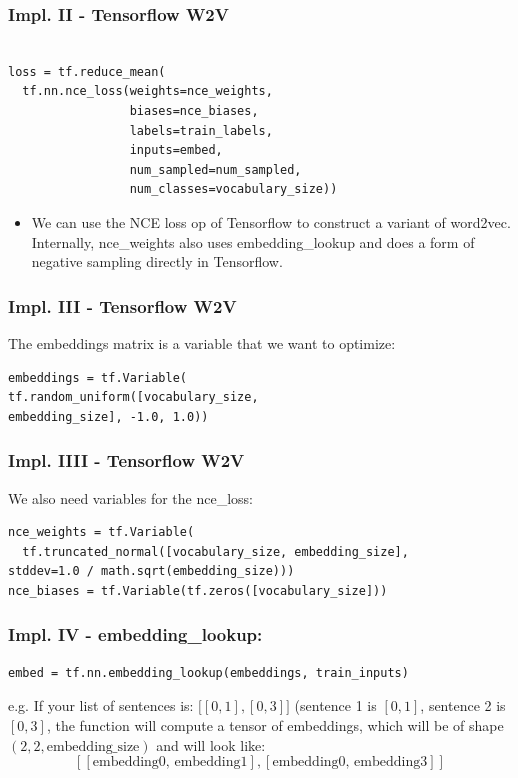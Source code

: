 \documentclass{beamer}
\begin{document}
 
   






\begin{frame}[fragile]
  \frametitle{Impl. II - Tensorflow W2V}
  \begin{lstlisting}

loss = tf.reduce_mean(
  tf.nn.nce_loss(weights=nce_weights,
                 biases=nce_biases,
                 labels=train_labels,
                 inputs=embed,
                 num_sampled=num_sampled,
                 num_classes=vocabulary_size))
    \end{lstlisting}
    
  \begin{itemize}
  	\item We can use the NCE loss op of Tensorflow to construct a variant of word2vec. Internally, nce\_weights also uses embedding\_lookup and does a form of negative sampling  directly in Tensorflow.
  \end{itemize}
\end{frame}
    
 \begin{frame}[fragile]
  \frametitle{Impl. III - Tensorflow W2V}
  The embeddings matrix is a variable that we want to optimize:
  \begin{lstlisting}
embeddings = tf.Variable(
tf.random_uniform([vocabulary_size,
embedding_size], -1.0, 1.0))
\end{lstlisting}    
\end{frame}

 \begin{frame}[fragile]
 \frametitle{Impl. IIII - Tensorflow W2V}
We also need variables for the nce\_loss:

\begin{footnotesize}
\begin{lstlisting}
nce_weights = tf.Variable(
  tf.truncated_normal([vocabulary_size, embedding_size],
stddev=1.0 / math.sqrt(embedding_size)))
nce_biases = tf.Variable(tf.zeros([vocabulary_size]))
\end{lstlisting}   
\end{footnotesize}    
\end{frame}

 \begin{frame}[fragile]
  \frametitle{Impl. IV - embedding\_lookup:}
  
  \begin{footnotesize}
 \begin{lstlisting}
embed = tf.nn.embedding_lookup(embeddings, train_inputs)
\end{lstlisting}
\end{footnotesize}    

e.g. If your list of sentences is: $\big[[0, 1], [0, 3]\big]$ (sentence 1 is $[0, 1]$, sentence 2 is $[0, 3]$, the function will compute a tensor of embeddings, which will be of shape $(2, 2, \text{embedding\_size})$ and will look like:
\\
$$[[\text{embedding0, embedding1}], [\text{embedding0, embedding3}]]$$

\end{frame}
\end{document}
